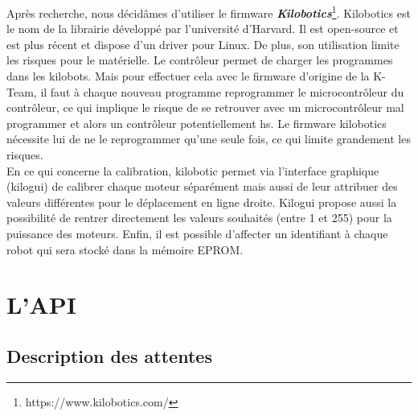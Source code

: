 \documentclass[a4paper,8pt]{report}
\begin{document}
Apr\`es recherche, nous d\'ecid\^ames d'utiliser le firmware \textit{\textbf{Kilobotics}}\footnote{https://www.kilobotics.com/}. Kilobotics est le nom de la librairie d\'evelopp\'e par l'universit\'e d'Harvard. Il est open-source et est plus r\'ecent et dispose d'un driver pour Linux. De plus, son utilisation limite les risques pour le mat\'erielle. Le contr\^oleur permet de charger les programmes dans les kilobots. Mais pour effectuer cela avec le firmware d'origine de la K-Team, il faut \`a chaque nouveau programme reprogrammer le microcontr\^oleur du contr\^oleur, ce qui implique le risque de se retrouver avec un microcontr\^oleur mal programmer et alors un contr\^oleur potentiellement hs. Le firmware kilobotics n\'ecessite lui de ne le reprogrammer qu'une seule fois, ce qui limite grandement les risques. \\
En ce qui concerne la calibration, kilobotic permet via l'interface graphique (kilogui) de calibrer chaque moteur s\'epar\'ement mais aussi de leur attribuer des valeurs diff\'erentes pour le d\'eplacement en ligne droite. Kilogui propose aussi la possibilit\'e de rentrer directement les valeurs souhait\'es (entre 1 et 255) pour la puissance des moteurs. Enfin, il est possible d'affecter un identifiant \`a chaque robot qui sera stock\'e dans la m\'emoire EPROM.\\



\chapter{L'API}

\section*{Description des attentes}\label{sec:name}
\end{document}
